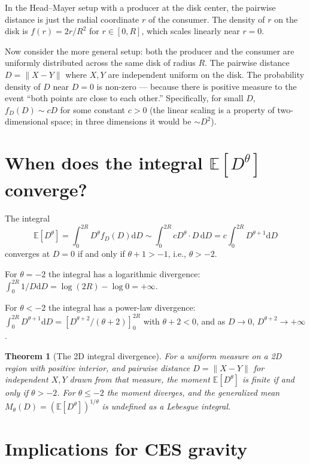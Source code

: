 \documentclass[11pt,letterpaper,oneside]{book}
\newtheorem{thm}{Theorem}[chapter]
\theoremstyle{definition}
\theoremstyle{remark}
\newcommand{\E}{\mathbb{E}}
\newcommand{\diff}{\mathrm{d}}
\begin{document}
In the Head--Mayer setup with a producer at the disk center, the pairwise distance is just the radial coordinate $r$ of the consumer. The density of $r$ on the disk is $f(r) = 2r/R^2$ for $r \in [0, R]$, which scales linearly near $r = 0$.

Now consider the more general setup: both the producer and the consumer are uniformly distributed across the same disk of radius $R$. The pairwise distance $D = \|X - Y\|$ where $X, Y$ are independent uniform on the disk. The probability density of $D$ near $D = 0$ is non-zero --- because there is positive measure to the event ``both points are close to each other.'' Specifically, for small $D$, $f_D(D) \sim cD$ for some constant $c > 0$ (the linear scaling is a property of two-dimensional space; in three dimensions it would be $\sim D^2$).

\section{When does the integral $\E[D^\theta]$ converge?}

The integral
\begin{equation}
\E[D^\theta] = \int_0^{2R} D^\theta f_D(D) \diff D \sim \int_0^{2R} c D^\theta \cdot D \, \diff D = c \int_0^{2R} D^{\theta+1} \diff D
\end{equation}
converges at $D = 0$ if and only if $\theta + 1 > -1$, i.e., $\theta > -2$.

For $\theta = -2$ the integral has a logarithmic divergence: $\int_0^{2R} 1/D \diff D = \log(2R) - \log 0 = +\infty$.

For $\theta < -2$ the integral has a power-law divergence: $\int_0^{2R} D^{\theta+1} \diff D = [D^{\theta+2}/(\theta+2)]_0^{2R}$ with $\theta + 2 < 0$, and as $D \to 0$, $D^{\theta+2} \to +\infty$.

\begin{thm}[The 2D integral divergence]
\label{thm:2d-divergence}
For a uniform measure on a 2D region with positive interior, and pairwise distance $D = \|X - Y\|$ for independent $X, Y$ drawn from that measure, the moment $\E[D^\theta]$ is finite if and only if $\theta > -2$. For $\theta \leq -2$ the moment diverges, and the generalized mean $M_\theta(D) = (\E[D^\theta])^{1/\theta}$ is undefined as a Lebesgue integral.
\end{thm}

\section{Implications for CES gravity}
\end{document}
